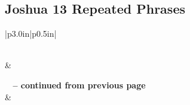 \subsection{Joshua 13 Repeated Phrases}


\normalsize
 
\begin{center}
\begin{longtable}{|p{3.0in}|p{0.5in}|}
\caption[Joshua 13 Repeated Phrases]{Joshua 13 Repeated Phrases}\label{table:Repeated Phrases Joshua 13} \\
\hline {} &  \\ \hline 
\endfirsthead
 
{{\bfseries \tablename\ \thetable{} -- continued from previous page}} \\  
\hline {} &  \\ \hline 
\endhead
 

\end{longtable}
\end{center}
